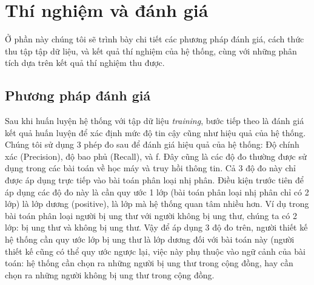 \section{Thí nghiệm và đánh giá} \label{sec:thi-nghiem-va-danh-gia}
Ở phần này chúng tôi sẽ trình bày chi tiết các phương pháp đánh giá, cách thức thu tập tập dữ liệu, và kết quả thí nghiệm của hệ thống, cùng với những phân tích dựa trên kết quả thí nghiệm thu được.
\subsection{Phương pháp đánh giá}
Sau khi huấn luyện hệ thống với tập dữ liệu \textit{training}, bước tiếp theo là đánh giá kết quả huấn luyện để xác định mức độ tin cậy cũng như hiệu quả của hệ thống. Chúng tôi sử dụng 3 phép đo sau để đánh giá hiệu quả của hệ thống: Độ chính xác (Precision), độ bao phủ (Recall), và f. Đây cũng là các độ đo thường được sử dụng trong các bài toán về học máy và truy hồi thông tin. Cả 3 độ đo này chỉ được áp dụng trực tiếp vào bài toán phân loại nhị phân. Điều kiện trước tiên để áp dụng các độ đo này là cần quy ước 1 lớp (bài toán phân loại nhị phân chỉ có 2 lớp) là lớp dương (positive), là lớp mà hệ thống quan tâm nhiều hơn. Ví dụ trong bài toán phân loại người bị ung thư với người không bị ung thư, chúng ta có 2 lớp: bị ung thư và không bị ung thư. Vậy để áp dụng 3 độ đo trên, người thiết kế hệ thống cần quy ước lớp bị ung thư là lớp dương đối với bài toán này (người thiết kế cũng có thể quy ước ngược lại, việc này phụ thuộc vào ngữ cảnh của bài toán: hệ thống cần chọn ra những người bị ung thư trong cộng đồng, hay cần chọn ra những người không bị ung thư trong cộng đồng.
